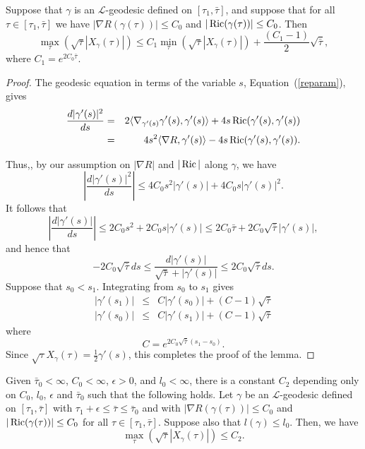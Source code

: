\begin{lemma}\label{lem:l-geodesic-min-max-estimate}
\label{min-max}

 Suppose  that
$\gamma$ is an ${\mathcal L}$-geodesic defined on
$[\tau_1,\bar\tau]$, and suppose that for all $\tau\in
[\tau_1,\bar\tau]$ we have $|\nabla R(\gamma(\tau))|\le C_0$ and
$|\operatorname{Ric}(\gamma(\tau))|\le C_0$. Then
$$\max_{\tau}\left(\sqrt{\tau}|X_\gamma(\tau)|\right)\le C_1\min_{\tau}\left(\sqrt{\tau}|X_\gamma(\tau)|\right)+\frac{(C_1-1)}{2}\sqrt{\bar\tau},$$
where $C_1=e^{2C_0\bar\tau}$.
\end{lemma}

\begin{proof}
\sketch
{}
The geodesic equation in terms of the variable $s$,
Equation~(\ref{reparam}), gives
\begin{eqnarray}
\frac{d|\gamma'(s)|^2}{ds} & = & 2\langle
\nabla_{\gamma'(s)}\gamma'(s),\gamma'(s)\rangle+4s\operatorname{Ric}(\gamma'(s),\gamma'(s))\nonumber \\
& = & 4s^2\langle\nabla R,\gamma'(s)\rangle -4s\operatorname{Ric}(\gamma'(s),\gamma'(s))\label{nablas}.
\end{eqnarray}

Thus,, by our assumption on $|\nabla R|$ and $|\operatorname{Ric}|$ along
$\gamma$, we have
$$\left|\frac{d|\gamma'(s)|^2}{ds}\right| \le
4C_0s^2|\gamma'(s)|+4C_0s|\gamma'(s)|^2.$$ It follows that
$$\left|\frac{d|\gamma'(s)|}{ds}\right|\le 2C_0s^2+2C_0s|\gamma'(s)|\le 2C_0\bar\tau+2
C_0\sqrt{\bar\tau}|\gamma'(s)|,$$ and hence that
$$-2C_0\sqrt{\bar\tau}ds\le \frac{d|\gamma'(s)|}{\sqrt{\bar\tau}+|\gamma'(s)|}
\le 2C_0\sqrt{\bar\tau}ds.$$ Suppose that $s_0<s_1$. Integrating from $s_0$ to
$s_1$ gives
\begin{eqnarray*}
|\gamma'(s_1)| & \le &  C|\gamma'(s_0)|+(C-1)\sqrt{\bar\tau} \\
|\gamma'(s_0)| & \le & C|\gamma'(s_1)|+(C-1)\sqrt{\bar\tau}
\end{eqnarray*}
where
\begin{equation*}
C=e^{2C_0\sqrt{\bar\tau}(s_1-s_0)}.
\end{equation*}
 Since
$\sqrt{\tau}X_\gamma(\tau)=\frac{1}{2}\gamma'(s)$, this completes
the proof of the lemma.
\end{proof}

\begin{corollary}\label{cor:l-geodesic-speed-bound}
\label{minmax}

Given $\bar\tau_0<\infty$, $C_0<\infty$, $\epsilon>0$, and $l_0<\infty$, there
is a constant $C_2$ depending only on $C_0$, $l_0$, $\epsilon$ and $\bar\tau_0$
such that the following holds. Let $\gamma$ be an ${\mathcal L}$-geodesic
defined on $[\tau_1,\bar\tau]$ with $\tau_1+\epsilon\le\bar\tau\le \bar\tau_0$
and with $|\nabla R(\gamma(\tau))|\le C_0$ and $|\operatorname{Ric}(\gamma(\tau))|\le
C_0$ for all $\tau\in [\tau_1,\bar\tau]$. Suppose also that $ l(\gamma)\le
l_0$. Then, we have
$$\max_{\tau}\left(\sqrt{\tau}|X_\gamma(\tau)|\right)\le C_2.$$
\end{corollary}


